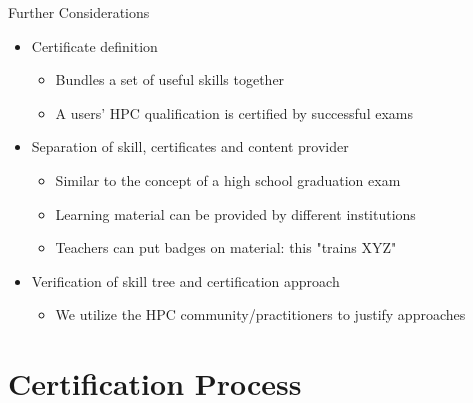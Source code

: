 \documentclass[compress,aspectratio=169]{beamer}
\begin{document}
\begin{frame}{Further Considerations}
	\begin{itemize}
		\item Certificate definition
		\begin{itemize}
			\item Bundles a set of useful skills together %
			\item A users' HPC qualification is certified by successful exams
		\end{itemize}
		\item Separation of skill, certificates and content provider
		\begin{itemize}
			\item Similar to the concept of a high school graduation exam %
			\item Learning material can be provided by different institutions
			\item Teachers can put badges on material: this "trains XYZ"
		\end{itemize}
		\item Verification of skill tree and certification approach
			\begin{itemize}
				\item We utilize the HPC community/practitioners to justify approaches
			\end{itemize}
	\end{itemize}
\end{frame}





\section{Certification Process}
\sectionIntroHidden
\end{document}
